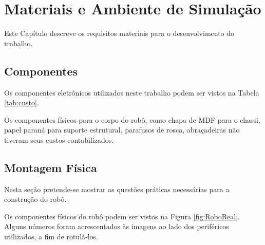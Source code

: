 \chapter{Materiais e Ambiente de Simulação}
\vspace{-2.5 cm}

Este Capítulo descreve os requisitos materiais para o desenvolvimento do
trabalho. 

\section{Componentes}

Os componentes eletrônicos utilizados neste trabalho podem ser vistos na Tabela 
\ref{tab:custo}.



Os componentes físicos para o corpo do robô, como chapa de MDF para o chassi, papel 
paraná para suporte estrutural, parafusos de rosca, abraçadeiras não tiveram 
seus custos contabilizados.

\section{Montagem Física}

	Nesta seção pretende-se mostrar as questões práticas necessárias para a construção do 
	robô.
	
	Os componentes físicos do robô podem ser vistos na Figura \ref{fig:RoboReal}. Alguns
	números foram acrescentados às imagens ao lado dos periféricos utilizados, a fim de 
	rotulá-los.
	
	
	
